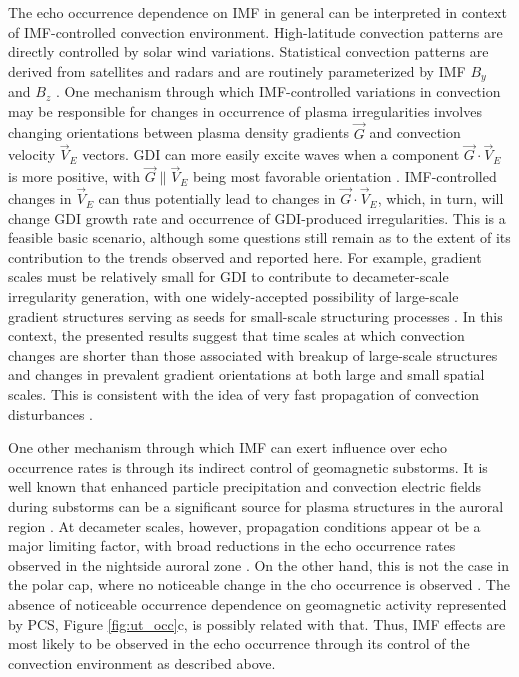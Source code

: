 The echo occurrence dependence on IMF in general can be interpreted in context of IMF-controlled convection environment. High-latitude convection patterns are directly controlled by solar wind variations. Statistical convection patterns are derived from satellites and radars and are routinely parameterized by IMF \(B_y\) and \(B_z\) \citep{Haaland2007, Pettigrew2010}. One mechanism through which IMF-controlled variations in convection may be responsible for changes in occurrence of plasma irregularities involves changing orientations between plasma density gradients \(\vec{G}\) and convection velocity \(\vec{V}_E\) vectors. GDI can more easily excite waves when a component \(\vec{G}\cdot\vec{V}_E\) is more positive, with \(\vec{G}\parallel\vec{V}_E\) being most favorable orientation \citep{Keskinen1982,Makarevich2014c}. IMF-controlled changes in \(\vec{V}_E\) can thus potentially lead to changes in \(\vec{G}\cdot\vec{V}_E\), which, in turn, will change GDI growth rate and occurrence of GDI-produced irregularities. This is a feasible basic scenario, although some questions still remain as to the extent of its contribution to the trends observed and reported here. For example, gradient scales must be relatively small for GDI to contribute to decameter-scale irregularity generation, with one widely-accepted possibility of large-scale gradient structures serving as seeds for small-scale structuring processes \citep{Tsunoda1988}. In this context, the presented results suggest that time scales at which convection changes are shorter than those associated with breakup of large-scale structures and changes in prevalent gradient orientations at both large and small spatial scales. This is consistent with the idea of very fast propagation of convection disturbances \citep{Ridley1998,Ruohoniemi2002,Fiori2012,Taguchi2015}.

One other mechanism through which IMF can exert influence over echo occurrence rates is through its indirect control of geomagnetic substorms.  It is well known that enhanced particle precipitation and convection electric fields during substorms can be a significant source for plasma structures in the auroral region \citep[e.g.][]{Tsunoda1988}.  At decameter scales, however, propagation conditions appear ot be a major limiting factor, with broad reductions in the echo occurrence rates observed in the nightside auroral zone \citep{Wild2008}.  On the other hand, this is not the case in the polar cap, where no noticeable change in the cho occurrence is observed \citep[Figures 1 and 2]{Wild2008}.  The absence of noticeable occurrence dependence on geomagnetic activity represented by PCS, Figure \ref{fig:ut_occ}c, is possibly related with that.  Thus, IMF effects are most likely to be observed in the echo occurrence through its control of the convection environment as described above.



